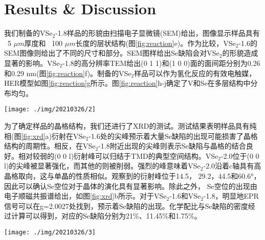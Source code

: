 \documentclass[reprint, aps, prb, showkeys]{revtex4-2}
\begin{document}
\section{Results \& Discussion}
我们制备的VSe$_2$-1.8样品的形貌由扫描电子显微镜(SEM)给出，图像显示样品具有 ~5 $\mu m$厚度和 ~100 $\mu m$长度的层状结构(图\ref{fig:reaction}e)。作为比较，VSe$_2$-1.6的SEM图像则给出了不同的尺寸和部分。SEM图样给出Se缺陷会对VSe$_2$的形貌造成显著的影响。VSe$_2$-1.8的高分辨率TEM给出(0 1 1)和(1 0 0)面的面间距分别为0.26和0.29 nm(图\ref{fig:reaction}f)。制备的VSe$_2$样品可以作为氢化反应的有效电触媒，HER模型如图\ref{fig:reaction}g所示。图\ref{fig:reaction}h-j确定了V和Se在多层结构中分布均匀。
\begin{figure*}[t]
    \texttt{[image: ./img/20210326/2]}
    \caption{\label{fig:xrd} 
    不同配比的XRD图样。
    }
\end{figure*}

为了确定样品的晶格结构，我们还进行了XRD的测试。测试结果表明样品具有纯相(图\ref{fig:xrd}a)衍射在VSe$_2$-1.6处的尖峰预示着大量Se缺陷的出现可能损害了晶格结构的周期性。相反，在VSe$_2$-1.8附近出现的尖峰则表示Se缺陷与晶格的结合良好。相对较弱的(0 0 l)衍射峰可以归结于TMD的典型空间结构。VSe$_2$-2.0位于(0 0 l)的尖峰被显著强化，而其他的则被削弱。强烈的峰意味着VSe$_2$-2.0沿着c轴具有高晶格取向，这与单晶的性质相似。观察到的衍射峰位于14.5， 29.2，44.5和60.6°，因此可以确认Se空位对于晶体的演化具有显著影响。除此之外， Se空位的出现由电子顺磁共振谱给出，如图\ref{fig:xrd}b所示。对于VSe$_2$-1.6和VSe$_2$-1.8，明显地EPR信号可以在g=2.0027处找到，预示着Se缺陷的出现。化学配比与Se缺陷的密度经过计算可以得到，对应的Se缺陷分别为21\%、11.45\%和1.75\%。
\begin{figure*}[t]
    \texttt{[image: ./img/20210326/3]}
    \caption{\label{fig:HER} 
    VSe$_2$样品的HER性能。(a)VSe$_2$-1.8，VSe$_2$-1.6，VSe$_2$-2.0的极化曲线。(b)通过极化曲线得到的Tafel斜率。(c)VSe$_2$-1.8在1000CV循环前后的极化曲线；(d)VSe$_2$-1.8在48h后的长期稳定性曲线；(e)VSe$_2$-1.6，VSe$_2$-1.8，VSe$_2$-2.0的Nyquist图像；(f)VSe$_2$-1.8的过电势与其他文献的比较。
    }
\end{figure*}
\end{document}
